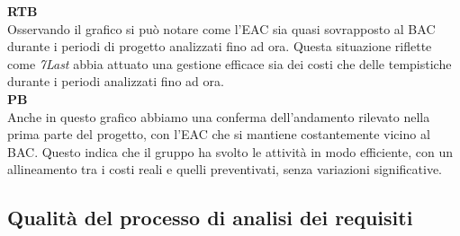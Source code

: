 \begin{flushleft}
\textbf{RTB} \\
Osservando il grafico si può notare come l'EAC sia quasi sovrapposto al BAC durante i periodi di progetto analizzati fino ad ora. Questa situazione riflette come \textit{7Last} abbia attuato una gestione efficace sia dei costi che delle tempistiche durante i periodi analizzati fino ad ora. \\
\textbf{PB} \\
Anche in questo grafico abbiamo una conferma dell'andamento rilevato nella prima parte del progetto, con l'EAC che si mantiene costantemente vicino al BAC. Questo indica che il gruppo ha svolto le attività in modo efficiente, con un allineamento tra i costi reali e quelli preventivati, senza variazioni significative.
\end{flushleft}

\newpage
\subsection{Qualità del processo di analisi dei requisiti}
